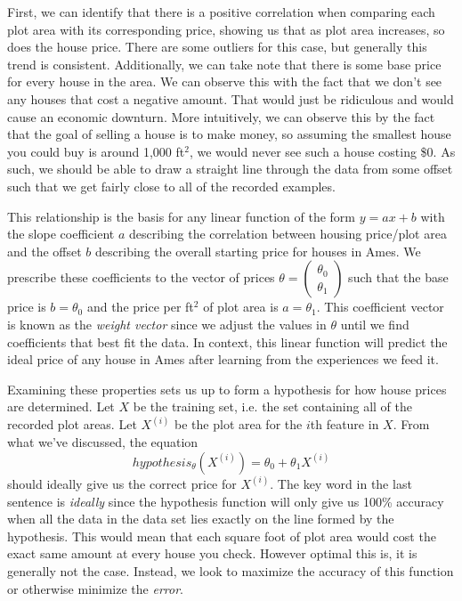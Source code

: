  First, we can identify that there is a positive correlation when comparing each plot area with its
corresponding price, showing us that as plot area increases, so does the house
price. There are some outliers for this case, but generally this trend is consistent. Additionally, we can take note that there is some base price for every house in the area. We can observe this with the fact that we don't see any houses that cost a negative amount. That would just be ridiculous and would cause an economic downturn. More intuitively, we can observe this by the fact that the goal of selling a house is to make money, so assuming the smallest house you could buy is around 1,000 ft$^2$, we would never see such a house costing \$0. As such, we should be able to draw a straight line through the data from some offset such that we get fairly close to all of the recorded examples.

This relationship is the basis for any linear function of the form $y=ax + b$ with the slope coefficient $a$ describing the correlation between housing price/plot area and the offset $b$ describing the overall starting price for houses in Ames. We prescribe these coefficients to the vector of prices $\theta = \begin{pmatrix}\theta_0 \\ \theta_1\end{pmatrix}$ such that the base price is $b = \theta_0$ and the price per ft$^2$ of plot area is $a=\theta_1$. This coefficient vector is known as the \emph{weight vector} since we adjust the values in $\theta$ until we find coefficients that best fit the data. In
context, this linear function will predict the ideal price of any house in Ames after learning from the experiences we feed it.

Examining these properties sets us up to form a hypothesis for how house prices
are determined. Let $X$ be the training set, i.e. the set containing all of the recorded plot areas. Let $X^{(i)}$ be the plot
area for the $i$th feature in $X$. From what we've discussed, the equation
\begin{equation}
    hypothesis_{\theta}(X^{(i)}) = \theta_0 + \theta_1X^{(i)}
\end{equation}
should ideally give us the correct price for $X^{(i)}$. The key word in the last
sentence is \emph{ideally} since the hypothesis function will only give us 100\%
accuracy when all the data in the data set lies exactly on the line formed by
the hypothesis. This would mean that each square foot of plot area would cost
the exact same amount at every house you check. However optimal this is, it is
generally not the case. Instead, we look to maximize the accuracy of this
function or otherwise minimize the \emph{error}.


